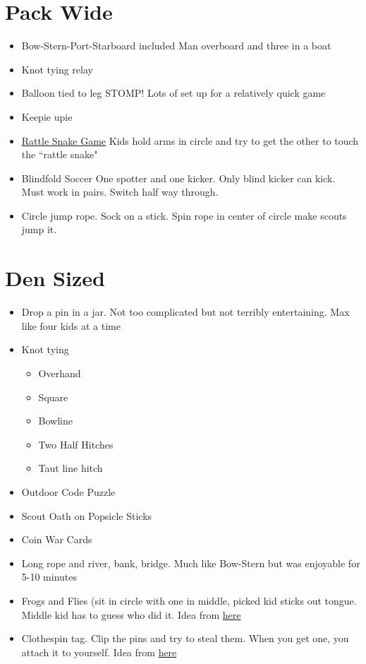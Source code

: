 \documentclass{exam}
\begin{document}
\section{Pack Wide}
\begin{itemize}
\item Bow-Stern-Port-Starboard included Man overboard and three in a boat
\item Knot tying relay
\item Balloon tied to leg STOMP!  Lots of set up for a relatively quick game
\item Keepie upie
\item \underline{\href{https://cubscoutideas.com/139/rattlesnake-game/}{Rattle Snake Game}} Kids hold arms in circle and try to get the other to touch the ``rattle snake"
\item Blindfold Soccer One spotter and one kicker.  Only blind kicker can kick.  Must work in pairs.  Switch half way through.
\item Circle jump rope.  Sock on a stick.  Spin rope in center of circle make scouts jump it.
\end{itemize}
\section{Den Sized}
\begin{itemize}
\item Drop a pin in a jar.  Not too complicated but not terribly entertaining.  Max like four kids at a time
\item Knot tying
\begin{itemize}
\item Overhand
\item Square
\item Bowline
\item Two Half Hitches
\item Taut line hitch
\end{itemize}
\item Outdoor Code Puzzle
\item Scout Oath on Popsicle Sticks
\item Coin War Cards
\item Long rope and river, bank, bridge.  Much like Bow-Stern but was enjoyable for 5-10 minutes
\item Frogs and Flies (sit in circle with one in middle, picked kid sticks out tongue.  Middle kid has to guess who did it.  Idea from \href{https://www.boyscouttrail.com/content/game/frogs\_and\_flies-521.asp}{here}
\item Clothespin tag.  Clip the pins and try to steal them.  When you get one, you attach it to yourself.  Idea from \href{https://www.boyscouttrail.com/content/game/clothespin\_tag-1465.asp}{here}
\end{itemize}
\end{document}

